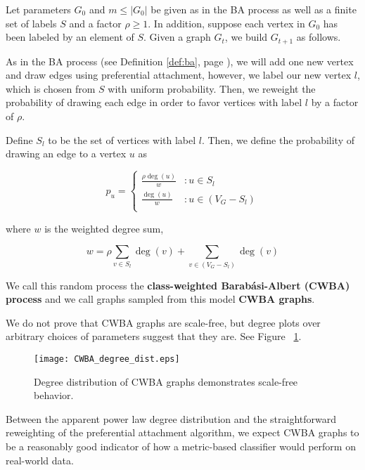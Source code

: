 \begin{definition}
  Let parameters $G_0$ and $m \leq |G_0|$ be given as in the BA process as well
  as a finite set of labels $S$ and a factor $\rho \ge 1$. In addition, suppose
  each vertex in $G_0$ has been labeled by an element of $S$. Given a graph
  $G_t$, we build $G_{t+1}$ as follows.

  As in the BA process (see Definition \ref{def:ba}, page \pageref{def:ba}), we will add one new vertex and draw
  edges using preferential attachment, however, we label our new vertex $l$, which is chosen from $S$
  with uniform probability. Then, we reweight the probability of drawing each edge in order to favor
  vertices with label $l$ by a factor of $\rho$.

  Define $S_l$ to be the set of vertices with label $l$. Then, we define the
  probability of drawing an edge to a vertex $u$ as

  \[
    p_u = \begin{cases}
      \frac{\rho\deg(u)}{w} &: u \in S_l\\
      
      \frac{\deg(u)}{w} &: u \in (V_G - S_l)\\
    \end{cases}
  \]

  where $w$ is the weighted degree sum,

  \[
    w = \rho \sum_{v \in S_l}\deg(v) + \sum_{v \in (V_G - S_l)}\deg(v)
  \]

  We call this random process the \textbf{class-weighted Barab\'asi-Albert
    (CWBA) process} and we call graphs sampled from this model \textbf{CWBA
    graphs}.

\end{definition}

We do not prove that CWBA graphs are scale-free, but degree plots over arbitrary choices of
parameters suggest that they are. See Figure ~\ref{fig:cwba_degs}.

\begin{figure}[H]
  \centering
  \texttt{[image: CWBA\_degree\_dist.eps]}
  \caption{Degree distribution of CWBA graphs demonstrates scale-free behavior.}
  \label{fig:cwba_degs}
\end{figure}

Between the apparent power law degree distribution and the straightforward reweighting of the
preferential attachment algorithm, we expect CWBA graphs to be a reasonably good indicator of how a
metric-based classifier would perform on real-world data.


